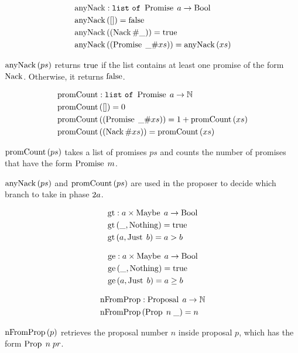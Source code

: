 \begin{align*}
&\anyNackName : \List{\Promise{a}} \to \Bool\\
&\anyNack{\EmptyList} = \False\\
&\anyNack{\ListPattern{\Nack}{\Wildcard}} = \True\\
&\anyNack{\ListPattern{\Promise{\Wildcard}}{xs}} = \anyNack{xs}
\end{align*}

$\anyNack{ps}$ returns $\True$ if the list contains at least one promise of the form $\Nack$.
Otherwise, it returns $\False$.

\begin{align*}
&\promiseCountName : \List{\Promise{a}} \to \mathbb{N}\\
&\promiseCount{\EmptyList} = 0\\
&\promiseCount{\ListPattern{\Promise{\Wildcard}}{xs}} = 1 + \promiseCount{xs}\\
&\promiseCount{\ListPattern{\Nack}{xs}} = \promiseCount{xs}
\end{align*}

$\promiseCount{ps}$ takes a list of promises $ps$ and counts the number of promises that have the form $\Promise{m}$.

$\anyNack{ps}$ and $\promiseCount{ps}$ are used in the proposer to decide which branch to take in phase $\PTwoA$.

\begin{align*}    
&\greaterThanName : a \times \Maybe{a} \to \Bool\\
&\greaterThan{\Wildcard}{\Nothing} = \True\\
&\greaterThan{a}{\Just{b}} = a > b
\end{align*}

\begin{align*}
&\greaterEqualName : a \times \Maybe{a} \to \Bool\\
&\greaterEqual{\Wildcard}{\Nothing} = \True\\
&\greaterEqual{a}{\Just{b}} = a \ge b
\end{align*}

\begin{align*}    
&\nFromProposalName : \Proposal{a} \to \mathbb{N}\\
&\nFromProposal{\ProposalC{n}{\Wildcard}} = n
\end{align*}

$\nFromProposal{p}$ retrieves the proposal number $n$ inside proposal $p$, which has the form $\ProposalC{n}{pr}$.

